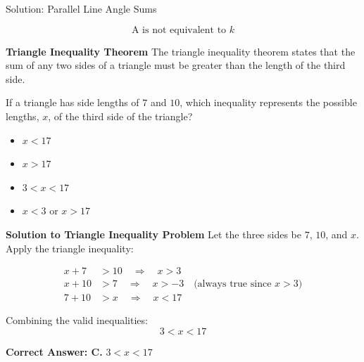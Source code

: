 \documentclass{beamer}
\begin{document}
\begin{frame}{Solution: Parallel Line Angle Sums}
\small

\[
\boxed{\text{A is not equivalent to } k}
\]
\end{frame}


\begin{frame}{\textbf{Triangle Inequality Theorem}}
The triangle inequality theorem states that the sum of any two sides of a triangle must be greater than the length of the third side.

If a triangle has side lengths of $7$ and $10$, which inequality represents the possible lengths, $x$, of the third side of the triangle?

\begin{itemize}
    \item[A.] $x < 17$
    \item[B.] $x > 17$
    \item[C.] $3 < x < 17$
    \item[D.] $x < 3$ or $x > 17$
\end{itemize}
\end{frame}


\begin{frame}{\textbf{Solution to Triangle Inequality Problem}}
Let the three sides be $7$, $10$, and $x$. Apply the triangle inequality:

\begin{align*}
x + 7 &> 10 \quad \Rightarrow \quad x > 3 \\
x + 10 &> 7 \quad \Rightarrow \quad x > -3 \quad \text{(always true since } x > 3) \\
7 + 10 &> x \quad \Rightarrow \quad x < 17
\end{align*}

Combining the valid inequalities:
\[
3 < x < 17
\]

\textbf{Correct Answer: C. } $3 < x < 17$
\end{frame}
\end{document}
